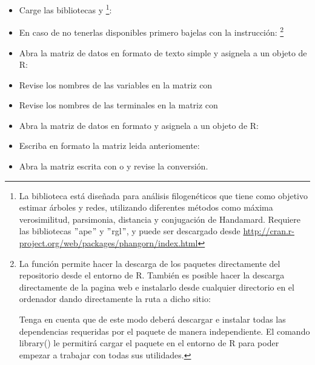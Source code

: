 \begin{enumerate}
\begin{itemize}
		\item Carge las bibliotecas  y \footnote{La biblioteca  est\'a diseñada para an\'alisis filogen\'eticos que tiene como objetivo estimar \'arboles y redes,  utilizando diferentes m\'etodos como m\'axima verosimilitud,  parsimonia, distancia y conjugaci\'on de Handamard. Requiere las bibliotecas $"$ape$"$ y $"$rgl$"$,  y puede ser descargado desde \url {http://cran.r-project.org/web/packages/phangorn/index.html}}: 

		\item En caso de no tenerlas disponibles primero bajelas con la instrucci\'on:
		\footnote{La funci\'on  permite hacer la descarga de los paquetes directamente del repositorio desde el entorno de R. Tambi\'en es posible hacer la descarga directamente de la pagina web e instalarlo desde cualquier directorio en el ordenador dando directamente la ruta a dicho sitio: 
		
		Tenga en cuenta que de este modo deberá descargar e instalar todas las dependencias requeridas por el paquete de manera independiente. El comando library() le permitir\'a cargar el paquete en el entorno de R para poder empezar a trabajar con todas sus utilidades.}

		\item Abra la matriz de datos en formato de texto simple y asignela a un objeto de R: 

		\item Revise los nombres de las variables en la matriz con

		\item Revise los nombres de las terminales en la matriz con

		\item Abra la matriz de datos en formato  y asignela a un objeto de R: 

		\item Escriba en formato   la matriz leida anteriomente:

		\item Abra la matriz escrita con  o  y revise la conversi\'on.
	\end{itemize}


\end{enumerate}
